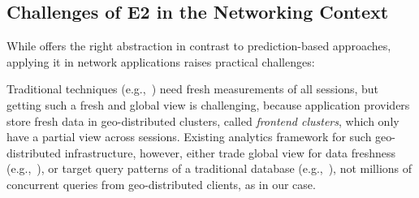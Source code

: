 \subsection{Challenges of E2 in the Networking Context}
While \mab offers the right abstraction in contrast to prediction-based approaches,
 applying it in network applications raises practical challenges:
\begin{packeditemize}
\item %
Traditional \mab
techniques (e.g.,~\cite{mab,linucb,velox-cidr}) need fresh measurements of all sessions, 
but getting such a fresh and global view is challenging, because application providers
store fresh data in geo-distributed clusters, called {\em frontend clusters}, which only have a partial view across sessions.
Existing analytics framework for such geo-distributed infrastructure, however, either trade global view for
data freshness (e.g.,~\cite{c3}), or target query patterns of a traditional database (e.g.,~\cite{iris}), not
millions of concurrent queries from geo-distributed clients, as in our case.





\end{packeditemize}
